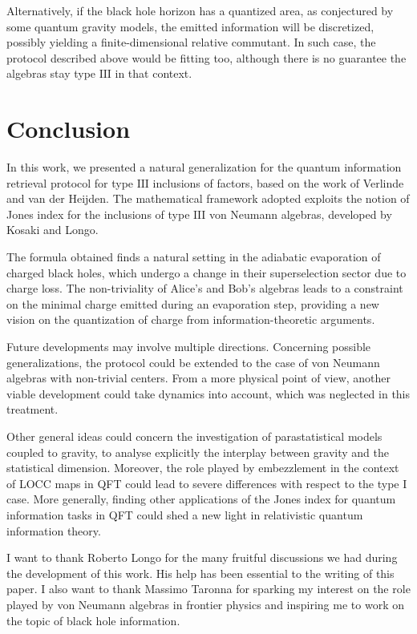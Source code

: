 \documentclass[a4paper,11pt]{article}
\begin{document}
Alternatively, if the black hole horizon has a quantized area, as conjectured by some quantum gravity models, the emitted information will be discretized, possibly yielding a finite-dimensional relative commutant. In such case, the protocol described above would be fitting too, although there is no guarantee the algebras stay type $\mathrm{III}$ in that context.

\section{Conclusion}
In this work, we presented a natural generalization for the quantum information retrieval protocol for type $\mathrm{III}$ inclusions of factors, based on the work of Verlinde and van der Heijden. The mathematical framework adopted exploits the notion of Jones index for the inclusions of type $\mathrm{III}$ von Neumann algebras, developed by Kosaki and Longo.

The formula obtained finds a natural setting in the adiabatic evaporation of charged black holes, which undergo a change in their superselection sector due to charge loss.
The non-triviality of Alice's and Bob's algebras leads to a constraint on the minimal charge emitted during an evaporation step, providing a new vision on the quantization of charge from information-theoretic arguments.

Future developments may involve multiple directions. Concerning possible generalizations, the protocol could be extended to the case of von Neumann algebras with non-trivial centers. From a more physical point of view, another viable development could take dynamics into account, which was neglected in this treatment.

Other general ideas could concern the investigation of parastatistical models coupled to gravity, to analyse explicitly the interplay between gravity and the statistical dimension. Moreover, the role played by embezzlement in the context of LOCC maps in QFT could lead to severe differences with respect to the type $\mathrm{I}$ case. More generally, finding other applications of the Jones index for quantum information tasks in QFT could shed a new light in relativistic quantum information theory.

\acknowledgments
I want to thank Roberto Longo for the many fruitful discussions we had during the development of this work. His help has been essential to the writing of this paper. I also want to thank Massimo Taronna for sparking my interest on the role played by von Neumann algebras in frontier physics and inspiring me to work on the topic of black hole information.
\end{document}
